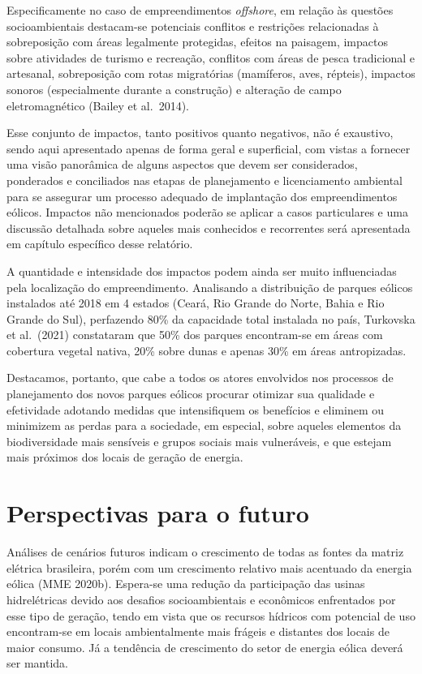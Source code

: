 \documentclass[
  oneside]{scrbook}
\begin{document}
Especificamente no caso de empreendimentos \emph{offshore}, em relação às questões socioambientais destacam-se potenciais conflitos e restrições relacionadas à sobreposição com áreas legalmente protegidas, efeitos na paisagem, impactos sobre atividades de turismo e recreação, conflitos com áreas de pesca tradicional e artesanal, sobreposição com rotas migratórias (mamíferos, aves, répteis), impactos sonoros (especialmente durante a construção) e alteração de campo eletromagnético (Bailey et al.~2014).

Esse conjunto de impactos, tanto positivos quanto negativos, não é exaustivo, sendo aqui apresentado apenas de forma geral e superficial, com vistas a fornecer uma visão panorâmica de alguns aspectos que devem ser considerados, ponderados e conciliados nas etapas de planejamento e licenciamento ambiental para se assegurar um processo adequado de implantação dos empreendimentos eólicos. Impactos não mencionados poderão se aplicar a casos particulares e uma discussão detalhada sobre aqueles mais conhecidos e recorrentes será apresentada em capítulo específico desse relatório.

A quantidade e intensidade dos impactos podem ainda ser muito influenciadas pela localização do empreendimento. Analisando a distribuição de parques eólicos instalados até 2018 em 4 estados (Ceará, Rio Grande do Norte, Bahia e Rio Grande do Sul), perfazendo 80\% da capacidade total instalada no país, Turkovska et al.~(2021) constataram que 50\% dos parques encontram-se em áreas com cobertura vegetal nativa, 20\% sobre dunas e apenas 30\% em áreas antropizadas.

Destacamos, portanto, que cabe a todos os atores envolvidos nos processos de planejamento dos novos parques eólicos procurar otimizar sua qualidade e efetividade adotando medidas que intensifiquem os benefícios e eliminem ou minimizem as perdas para a sociedade, em especial, sobre aqueles elementos da biodiversidade mais sensíveis e grupos sociais mais vulneráveis, e que estejam mais próximos dos locais de geração de energia.

\hypertarget{perspectivas-para-o-futuro}{%
\section{Perspectivas para o futuro}\label{perspectivas-para-o-futuro}}

Análises de cenários futuros indicam o crescimento de todas as fontes da matriz elétrica brasileira, porém com um crescimento relativo mais acentuado da energia eólica (MME 2020b). Espera-se uma redução da participação das usinas hidrelétricas devido aos desafios socioambientais e econômicos enfrentados por esse tipo de geração, tendo em vista que os recursos hídricos com potencial de uso encontram-se em locais ambientalmente mais frágeis e distantes dos locais de maior consumo. Já a tendência de crescimento do setor de energia eólica deverá ser mantida.
\end{document}
